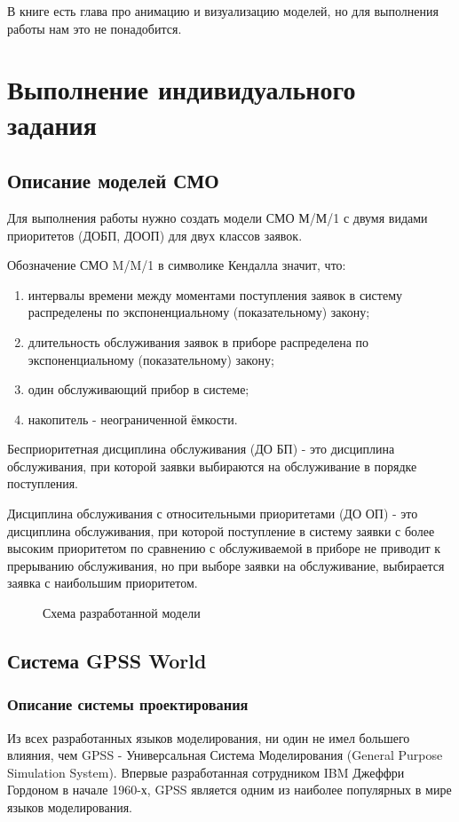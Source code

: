 \documentclass[a4paper,14pt]{report} %
\begin{document}
В книге есть глава про анимацию и визуализацию моделей, но для выполнения работы нам это не понадобится.
\chapter{Выполнение индивидуального задания}
\section{Описание моделей СМО}
Для выполнения работы нужно создать модели СМО М/М/1 с двумя видами приоритетов (ДОБП, ДООП) для двух классов заявок. 

Обозначение СМО M/M/1  в символике Кендалла значит, что:
\begin{enumerate} %
\item интервалы времени между моментами поступления заявок в систему распределены по экспоненциальному (показательному) закону;
\item длительность обслуживания заявок в приборе распределена по экспоненциальному (показательному) закону;
\item один обслуживающий прибор в системе;
\item накопитель - неограниченной ёмкости.
\end{enumerate}

Бесприоритетная дисциплина обслуживания (ДО БП) - это дисциплина обслуживания, при которой заявки выбираются на обслуживание в порядке поступления.

Дисциплина обслуживания с относительными приоритетами (ДО ОП) - это дисциплина обслуживания, при которой поступление в систему заявки с более высоким приоритетом по сравнению с обслуживаемой в приборе не приводит к прерыванию обслуживания, но при выборе заявки на обслуживание, выбирается заявка с наибольшим приоритетом. 

\begin{figure}[h] %
\caption{Схема разработанной модели}
\label{ris:model}
\end{figure} %

\section{Система GPSS World}
\subsection{Описание системы проектирования}
Из всех разработанных языков моделирования, ни один не имел большего влияния, чем GPSS - Универсальная Система Моделирования (General Purpose Simulation System). Впервые разработанная сотрудником IBM Джеффри Гордоном в начале 1960-х, GPSS является одним из наиболее популярных в мире языков моделирования.
\end{document}
